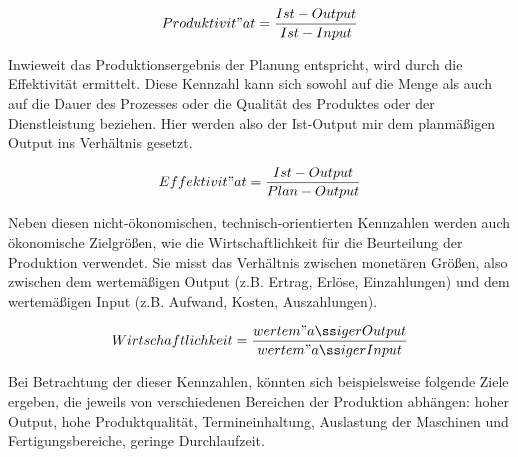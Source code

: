 \documentclass[a4paper,12pt, german]{report}
\begin{document}
\begin{equation}
  Produktivit"at =\frac{Ist-Output}{Ist-Input}
\end{equation}

Inwieweit das Produktionsergebnis der Planung entspricht, wird durch die Effektivität ermittelt. Diese Kennzahl kann sich sowohl auf die Menge als auch auf die Dauer des Prozesses oder die Qualität des Produktes oder der Dienstleistung beziehen. Hier werden also der Ist-Output mir dem planmäßigen Output ins Verhältnis gesetzt.\cite{20}

\begin{equation}
  Effektivit"at =\frac{Ist-Output}{Plan-Output}
\end{equation}


Neben diesen nicht-ökonomischen, technisch-orientierten Kennzahlen werden auch ökonomische Zielgrößen, wie die Wirtschaftlichkeit für die Beurteilung der Produktion verwendet. Sie misst das Verhältnis zwischen monetären Größen, also zwischen dem wertemäßigen Output (z.B. Ertrag, Erlöse, Einzahlungen) und dem wertemäßigen Input (z.B. Aufwand, Kosten, Auszahlungen).\cite{7}

\begin{equation}
  Wirtschaftlichkeit =\frac{wertem"aßiger Output}{wertem"aßiger Input}
\end{equation}

Bei Betrachtung der dieser Kennzahlen, könnten sich beispielsweise folgende Ziele ergeben, die jeweils von verschiedenen Bereichen der Produktion abhängen: hoher Output, hohe Produktqualität, Termineinhaltung, Auslastung der Maschinen und Fertigungsbereiche, geringe Durchlaufzeit. 
\end{document}
